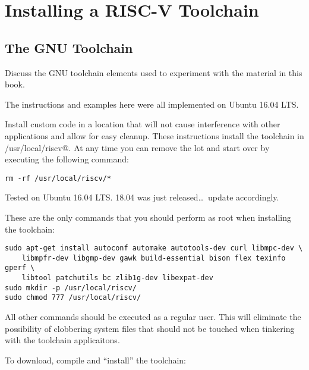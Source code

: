 \chapter{Installing a RISC-V Toolchain}
\label{chapter:install}

\section{The GNU Toolchain}

Discuss the GNU toolchain elements used to experiment with the 
material in this book.

%
The instructions and examples here were all implemented on Ubuntu 16.04 LTS. 

Install custom code in a location that will not cause interference with
other applications and allow for easy cleanup.  These instructions 
install the toolchain in \verb@/usr/local/riscv@.  At any time
you can remove the lot and start over by executing the following 
command:

\begin{verbatim}
rm -rf /usr/local/riscv/*
\end{verbatim}


Tested on Ubuntu 16.04 LTS.   
18.04 was just released\ldots\ update accordingly.

These are the only commands that you should perform as root when installing
the toolchain:

\begin{verbatim}
sudo apt-get install autoconf automake autotools-dev curl libmpc-dev \
	libmpfr-dev libgmp-dev gawk build-essential bison flex texinfo gperf \
	libtool patchutils bc zlib1g-dev libexpat-dev
sudo mkdir -p /usr/local/riscv/
sudo chmod 777 /usr/local/riscv/ 
\end{verbatim}

All other commands should be executed as a regular user.  This will eliminate the
possibility of clobbering system files that should not be touched when tinkering with
the toolchain applicaitons.

To download, compile and ``install'' the toolchain:


